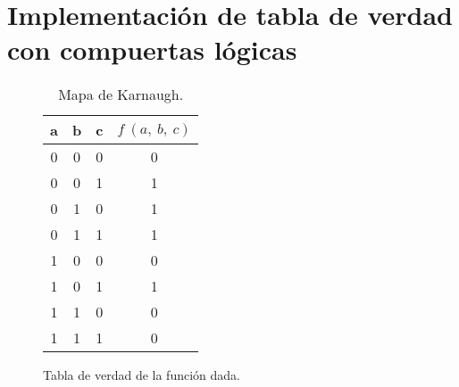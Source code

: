 \section{Implementación de tabla de verdad con compuertas lógicas}

\begin{table}[!htb]
	\vspace{5mm} %
	\begin{minipage}{.45\linewidth}
        \begin{figure}[H]
			\begin{tabular}{c|c|c|c}
                a& b & c & $f~(a,~b,~c)$ \\\hline
                0& 0 & 0 & 0 \\
                0& 0 & 1 & 1 \\
                0& 1 & 0 & 1 \\
                0& 1 & 1 & 1 \\
                1& 0 & 0 & 0 \\
                1& 0 & 1 & 1 \\
                1& 1 & 0 & 0 \\
                1& 1 & 1 & 0 
               \end{tabular}
            \caption{Tabla de verdad de la función dada.}
		\end{figure}
	\end{minipage}%
	\begin{minipage}{.45\linewidth}
		\begin{figure}[H]
			\begin{center}
                \begin{Karnaughvuit}
				\end{Karnaughvuit}
				\label{table:mapaKarnaugh}
			\end{center}
        \end{figure}
        \caption{Mapa de Karnaugh.}
	\end{minipage} 
\end{table}




